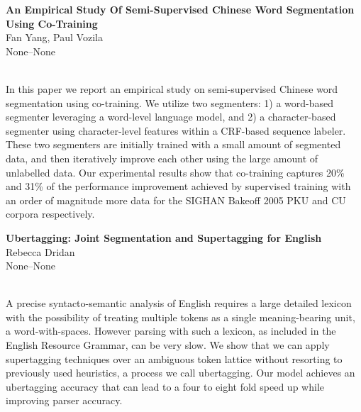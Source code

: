 \documentclass[twoside,makeidx]{book}
\renewcommand{\normalsize}{\fontsize{8}{9}\selectfont}
\renewcommand{\small}{\fontsize{7}{8}\selectfont}
\begin{document}
\par\vspace{2em}\noindent%
\begin{minipage}{\linewidth}%
\begin{center}
\textbf{\normalsize An Empirical Study Of Semi-Supervised Chinese Word Segmentation Using Co-Training}\\
\normalsize  Fan Yang,  Paul Vozila\\
{\small None--None}\\
\end{center}
\end{minipage}\\[0.5em]
\nopagebreak%
\noindent%
{\small In this paper we report an empirical study on semi-supervised Chinese word segmentation using co-training.  We utilize two segmenters: 1) a word-based segmenter leveraging a word-level language model, and 2) a character-based segmenter using character-level features within a CRF-based sequence labeler.  These two segmenters are initially trained with a small amount of segmented data, and then iteratively improve each other using the large amount of unlabelled data.  Our experimental results show that co-training captures 20\% and 31\% of the performance improvement achieved by supervised training with an order of magnitude more data for the SIGHAN Bakeoff 2005 PKU and CU corpora respectively.}
\par\vspace{2em}\noindent%
\begin{minipage}{\linewidth}%
\begin{center}
\textbf{\normalsize Ubertagging: Joint Segmentation and Supertagging for English}\\
\normalsize  Rebecca Dridan\\
{\small None--None}\\
\end{center}
\end{minipage}\\[0.5em]
\nopagebreak%
\noindent%
{\small A precise syntacto-semantic analysis of English requires a large detailed lexicon with the possibility of treating multiple tokens as a single meaning-bearing unit, a word-with-spaces. However parsing with such a lexicon, as included in the English Resource Grammar, can be very slow. We show that we can apply supertagging techniques over an ambiguous token lattice without resorting to previously used heuristics, a process we call ubertagging. Our model achieves an ubertagging accuracy that can lead to a four to eight fold speed up while improving parser accuracy.}
\end{document}
